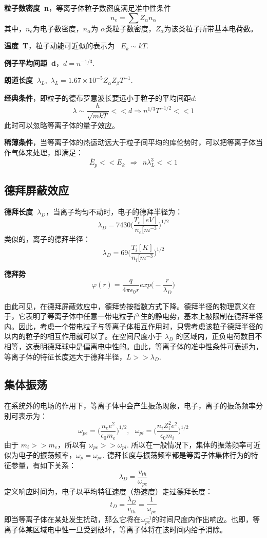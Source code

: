 \documentclass{article}
\begin{document}
\textbf{粒子数密度\ n}，等离子体粒子数密度满足准中性条件
$$ n_e = \sum Z_\alpha n_\alpha $$
其中，$n_e$为电子数密度，$n_\alpha$为 $\alpha$类粒子数密度，$Z_\alpha$为该类粒子所带基本电荷数。

\textbf{温度\ T}，粒子动能可近似的表示为 \ $E_k \sim kT$.

\textbf{例子平均间距\ d}，$d = n^{-1/3}$.

\textbf{朗道长度\  $\lambda_L$},\   $\lambda _L = 1.67 \times 10^{-5} Z_\alpha Z_\beta T^{-1} $.

\textbf{经典条件}，即粒子的德布罗意波长要远小于粒子的平均间距$d$:
$$ \lambda \sim \frac h {\sqrt{mkT}} << d \Rightarrow n^{1/3} T^{-1/2} << 1$$
此时可以忽略等离子体的量子效应。

\textbf{稀薄条件}，当等离子体的热运动远大于粒子间平均的库伦势时，可以把等离子体当作气体来处理，即满足：
$$ \bar{E}_p << E_k\ \ \Rightarrow \ \ n\lambda^3_L << 1$$

\subsection{德拜屏蔽效应}
\textbf{德拜长度\ $\lambda_D$}，当离子均匀不动时，电子的德拜半径为：
$$\lambda_D = 7430\bigg(\frac{T_e[eV]}{n_e[m^{-3}}\bigg)^{1/2}$$
类似的，离子的德拜半径：
$$\lambda_D = 69\bigg(\frac{T_i[K]}{n_i[m^{-3}}\bigg)^{1/2}$$

\textbf{德拜势}
$$ \varphi (r) = \frac{q}{4 \pi \epsilon _0 r} exp\big( - \frac r{\lambda_D} \big)$$

由此可见，在德拜屏蔽效应中，德拜势按指数方式下降。德拜半径的物理意义在于，它表明了等离子体中任意一带电粒子产生的静电势，基本上被限制在德拜半径内。因此，考虑一个带电粒子与等离子体相互作用时，只需考虑该粒子德拜半径的以内的粒子的相互作用就可以了。在空间尺度小于 $\lambda_D$ 的区域内，正负电荷数目不相等，这表明德拜球中是偏离电中性的。由此，等离子体的准中性条件可表述为，等离子体的特征长度远大于德拜半径，$L >> \lambda_D$.

\subsection{集体振荡}
在系统外的电场的作用下，等离子体中会产生振荡现象，电子，离子的振荡频率分别可表示为：
$$\omega_{pe} = \big( \frac{n_e e^2}{\epsilon_0 m_e} \big) ^ {1/2},\ \ \ \omega_{pi} = \big( \frac{n_i Z_i^2 e^2}{\epsilon_0 m_i} \big) ^ {1/2}  $$
由于 $m_i >> m_e$，所以有 $\omega_{pe} >> \omega_{pi}$. 所以在一般情况下，集体的振荡频率可近似为电子的振荡频率，$\omega_p = \omega_{pe}$. 德拜长度与振荡频率都是等离子体集体行为的特征参量，有如下关系：
$$ \lambda_D = \frac{v_{th}}{\omega_{pe}}$$
定义响应时间为，电子以平均特征速度（热速度）走过德拜长度：
$$ t_D = \frac{\lambda_D}{v_{th}} = \frac 1{\omega_{pe}}$$
即当等离子体在某处发生扰动，那么它将在$\omega_{pe}^{-1}$的时间尺度内作出响应。也即，等离子体某区域电中性一旦受到破坏，等离子体将在该时间内给予消除。
\end{document}
